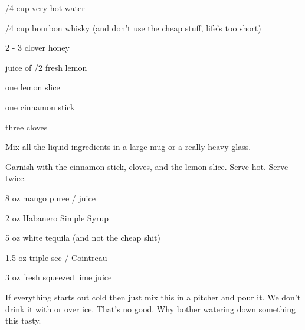 %
%
%
%
\newpage



\begin{IngredientsAndSteps}
    \ListIngredientsAndSteps
    {
        /4 cup very hot water

        /4 cup bourbon whisky (and don't use the cheap stuff, life's too short)

        2 - 3 \Tbl[s] clover honey

        juice of /2 fresh lemon

        one lemon slice

        one cinnamon stick

        three cloves
    }
    {
        Mix all the liquid ingredients in a large mug or a really heavy glass.

        Garnish with the cinnamon stick, cloves, and the lemon slice. Serve hot. Serve twice.
    }
\end{IngredientsAndSteps}

%
%
%
%
\newpage



\begin{IngredientsAndSteps}
    \ListIngredientsAndSteps
    {
        8 oz mango puree / juice

        2 oz Habanero Simple Syrup

        5 oz white tequila (and not the cheap shit)

        1.5 oz triple sec / Cointreau

        3 oz fresh squeezed lime juice
    }
    {
        If everything starts out cold then just mix this in a pitcher and pour it. We don't drink
        it with or over ice. That's no good. Why bother watering down something this tasty.
    }
\end{IngredientsAndSteps}

